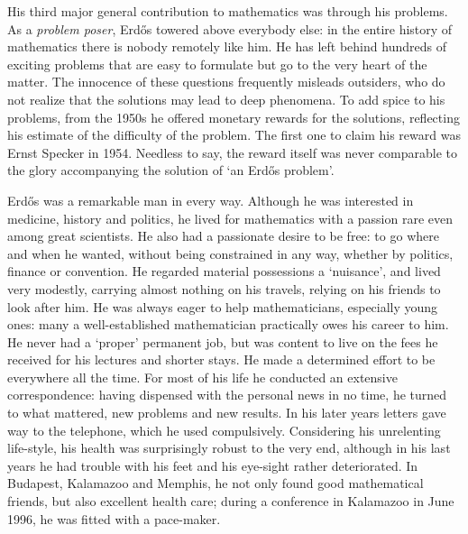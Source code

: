 \documentclass[a6paper]{article}
\begin{document}
His third major general contribution to mathematics was through his problems.
As a {\it problem poser}, Erd\H{o}s towered above everybody else:  
in the entire history of mathematics there is nobody remotely like him.
He has left behind hundreds of exciting problems that are easy to 
formulate but go to the very heart of the matter. 
The innocence of these questions 
frequently misleads outsiders, who do not realize that the solutions may 
lead to deep phenomena.
To add spice to his problems, from the 1950s he offered 
monetary rewards for the solutions, reflecting his estimate
of the difficulty of the problem. The first one to claim his reward was Ernst 
Specker in 1954. Needless to say, the reward itself  
was never comparable to the glory accompanying the
solution of `an Erd\H{o}s problem'.


Erd\H{o}s was a remarkable man in every way. Although he was 
interested in medicine, history and politics, he lived for mathematics with
a passion rare even among great scientists. He also had a passionate 
desire to be free: to go where and when he wanted, without being constrained
in any way, whether by politics, finance or convention. He regarded 
material possessions a `nuisance', and lived very modestly, carrying 
almost nothing on his travels,  relying on his friends to look after
him. He was always eager to help mathematicians, especially young ones: 
many a well-established mathematician practically owes his career to him. He
never had a `proper' permanent job, but was content to live on the fees he
received for his lectures and shorter stays. 
He made a determined effort to be everywhere all the time. For most of his
life he conducted an extensive correspondence: having dispensed with
the personal news in no time, he turned to what mattered, new problems and
new results. 
In his later years letters gave way to the telephone, which he 
used compulsively.
Considering his unrelenting
life-style, his health was surprisingly robust to the very end, 
although in his last years
he had trouble with his feet and his eye-sight rather deteriorated. In 
Budapest, Kalamazoo and Memphis, he not only found good mathematical friends,
but also excellent health care; during a conference in Kalamazoo in June 
1996, he was fitted with a pace-maker.
\end{document}
